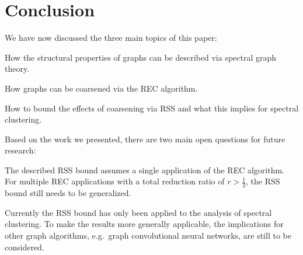 \section{Conclusion}%
\label{sec:conclusion}

We have now discussed the three main topics of this paper:
\begin{enumerate*}
	\item How the structural properties of graphs can be described via spectral graph theory.
	\item How graphs can be coarsened via the REC algorithm.
	\item How to bound the effects of coarsening via RSS and what this implies for spectral clustering.
\end{enumerate*}


Based on the work we presented, there are two main open questions for future research:
\begin{enumerate*}
	\item The described RSS bound assumes a single application of the REC algorithm.
		For multiple REC applications with a total reduction ratio of $r > \frac{1}{2}$, the RSS bound still needs to be generalized.
	\item Currently the RSS bound has only been applied to the analysis of spectral clustering.
		To make the results more generally applicable, the implications for other graph algorithms, e.g.\ graph convolutional neural networks, are still to be considered.
\end{enumerate*}
